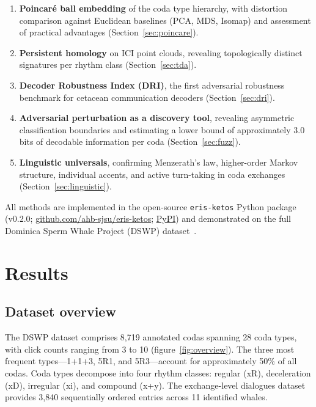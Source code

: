 \documentclass[11pt,a4paper]{article}
\begin{document}
\begin{enumerate}
    \item \textbf{Poincar\'e ball embedding} of the coda type hierarchy,
    with distortion comparison against Euclidean baselines (PCA, MDS,
    Isomap) and assessment of practical advantages
    (Section~\ref{sec:poincare}).

    \item \textbf{Persistent homology} on ICI point clouds, revealing
    topologically distinct signatures per rhythm class
    (Section~\ref{sec:tda}).

    \item \textbf{Decoder Robustness Index (DRI)}, the first adversarial
    robustness benchmark for cetacean communication decoders
    (Section~\ref{sec:dri}).

    \item \textbf{Adversarial perturbation as a discovery tool},
    revealing asymmetric classification boundaries and estimating a
    lower bound of approximately 3.0 bits of decodable information per
    coda (Section~\ref{sec:fuzz}).

    \item \textbf{Linguistic universals}, confirming Menzerath's law,
    higher-order Markov structure, individual accents, and active
    turn-taking in coda exchanges (Section~\ref{sec:linguistic}).
\end{enumerate}

All methods are implemented in the open-source \texttt{eris-ketos}
Python package (v0.2.0;
\href{https://github.com/ahb-sjsu/eris-ketos}{github.com/ahb-sjsu/eris-ketos};
\href{https://pypi.org/project/eris-ketos/}{PyPI})
and demonstrated on the full Dominica Sperm Whale Project (DSWP)
dataset~\citep{Sharma2024}.

\section{Results}

\subsection{Dataset overview}

The DSWP dataset comprises 8{,}719 annotated codas spanning 28 coda
types, with click counts ranging from 3 to 10 (figure~\ref{fig:overview}).
The three most frequent types---1+1+3, 5R1, and 5R3---account for
approximately 50\% of all codas. Coda types decompose into four rhythm
classes: regular (xR), deceleration (xD), irregular (xi), and compound
(x+y). The exchange-level dialogues dataset provides 3{,}840 sequentially
ordered entries across 11 identified whales.
\end{document}
